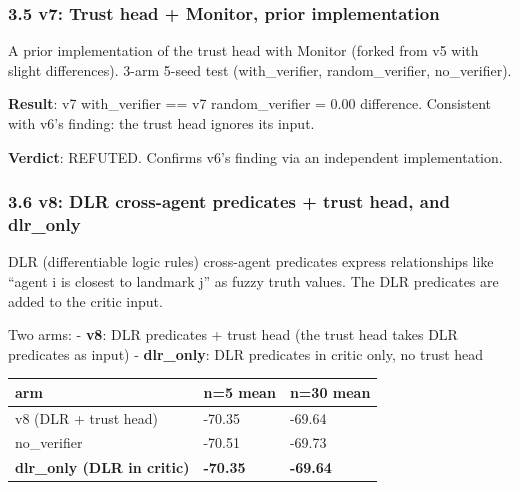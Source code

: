 \documentclass[
]{article}
\newcounter{none} %
\begin{document}
\subsubsection{3.5 v7: Trust head + Monitor, prior
implementation}\label{v7-trust-head-monitor-prior-implementation}

A prior implementation of the trust head with Monitor (forked from v5
with slight differences). 3-arm 5-seed test (with\_verifier,
random\_verifier, no\_verifier).

\textbf{Result}: v7 with\_verifier == v7 random\_verifier = 0.00
difference. Consistent with v6's finding: the trust head ignores its
input.

\textbf{Verdict}: REFUTED. Confirms v6's finding via an independent
implementation.

\subsubsection{3.6 v8: DLR cross-agent predicates + trust head, and
dlr\_only}\label{v8-dlr-cross-agent-predicates-trust-head-and-dlr_only}

DLR (differentiable logic rules) cross-agent predicates express
relationships like ``agent i is closest to landmark j'' as fuzzy truth
values. The DLR predicates are added to the critic input.

Two arms: - \textbf{v8}: DLR predicates + trust head (the trust head
takes DLR predicates as input) - \textbf{dlr\_only}: DLR predicates in
critic only, no trust head

{\def\LTcaptype{none} %
\begin{longtable}[]{@{}lll@{}}
\toprule\noalign{}
arm & n=5 mean & n=30 mean \\
\midrule\noalign{}
\endhead
\bottomrule\noalign{}
\endlastfoot
v8 (DLR + trust head) & -70.35 & -69.64 \\
no\_verifier & -70.51 & -69.73 \\
\textbf{dlr\_only (DLR in critic)} & \textbf{-70.35} &
\textbf{-69.64} \\
\end{longtable}
}
\end{document}
